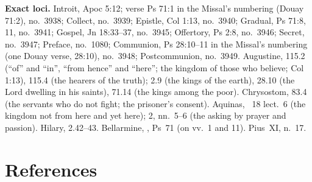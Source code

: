 {\textbf{Exact loci.} Introit, Apoc 5:12; verse Ps 71:1 in the Missal's
numbering (Douay 71:2), no.~3938; Collect, no.~3939; Epistle, Col 1:13,
no.~3940; Gradual, Ps 71:8, 11, no.~3941; Gospel, Jn 18:33--37, no.~3945;
Offertory, Ps 2:8, no.~3946; Secret, no.~3947; Preface, no.~1080; Communion,
Ps 28:10--11 in the Missal's numbering (one Douay verse, 28:10), no.~3948;
Postcommunion, no.~3949. Augustine, 
115.2 (``of'' and ``in'', ``from hence'' and ``here''; the kingdom of those
who believe; Col 1:13), 115.4 (the hearers of the truth);  2.9 (the kings of the earth), 28.10 (the Lord dwelling in his
saints), 71.14 (the kings among the poor). Chrysostom,  83.4 (the servants who do not fight; the prisoner's consent). Aquinas,
\ 18 lect.~6 (the kingdom not from here and yet here);
 2, nn.~5--6 (the asking by prayer and passion).
Hilary,  2.42--43. Bellarmine,
, Ps~71 (on vv.~1 and 11). Pius~XI, 
n.~17.

\par}

\section*{References}

